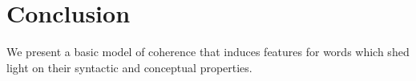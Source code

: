 \documentclass[11pt,letterpaper]{article}
\begin{document}

\section{Conclusion} %
We present a basic model of coherence that induces features for words
which shed light on their syntactic and conceptual properties.





{}

\end{document}

